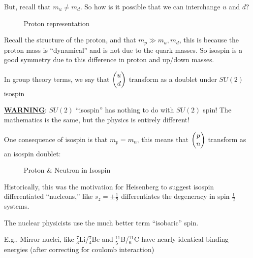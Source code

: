 But, recall that $m_u\neq m_d$. So how is it possible that we can interchange $u$ and $d$?
\begin{figure}[H]
  \centering
  \caption{Proton representation}
  \label{fig:proton}
\end{figure}
Recall the structure of the proton, and that $m_p\gg m_u,m_d$, this is because the proton mass is ``dynamical'' and is not due to the quark masses. So isospin is a good symmetry due to this difference in proton and up/down masses.

In group theory terms, we say that $\pmqty{u\\d}$ transform as a doublet under $SU(2)$ isospin

\begin{remark}
  \underline{\textbf{WARNING}}: $SU(2)$ ``isospin'' has nothing to do with $SU(2)$ spin! The mathematics is the same, but the physics is entirely different!
\end{remark}
One consequence of isospin is that $m_p=m_n$, this means that $\pmqty{p\\n}$ transform as an isospin doublet:
\begin{figure}[H]
  \centering
  \caption{Proton \& Neutron in Isospin}
  \label{fig:isospinpn}
\end{figure}
Historically, this was the motivation for Heisenberg to suggest isospin differentiated ``nucleons,'' like $s_z=\pm\frac12$ differentiates the degeneracy in spin $\frac12$ systems.
\begin{note}
  The nuclear physicists use the much better term ``isobaric'' spin.

  E.g., Mirror nuclei, like $^7_3$Li/$^7_4$Be and $^{11}_5$B/$^{11}_6$C have nearly identical binding energies (after correcting for coulomb interaction)
\end{note}

